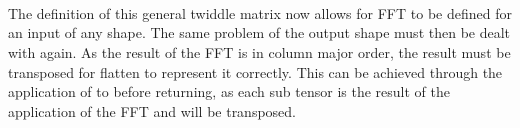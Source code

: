 \begin{AgdaAlign}
\begin{code}
\AgdaSymbol{(}\AgdaSpace{}%
\AgdaSymbol{(}\AgdaSpace{}%
\AgdaSpace{}%
\AgdaSymbol{))}\AgdaSpace{}%
\AgdaSymbol{(}\AgdaSpace{}%
\AgdaSymbol{)}\<%
\end{code}
\begin{code}[hide]%
\>[2][@{}l@{\AgdaIndent{1}}]%
\>[6]\<%
\\
\>[6][@{}l@{\AgdaIndent{0}}]%
\>[8]\<%
\\
\>[8][@{}l@{\AgdaIndent{0}}]%
\>[10]\<%
\\
\>[10][@{}l@{\AgdaIndent{0}}]%
\>[12]\AgdaSymbol{\AgdaUnderscore{}}\AgdaSpace{}%
\AgdaSymbol{:}\AgdaSpace{}%
\AgdaSpace{}%
\AgdaSymbol{(}\AgdaSpace{}%
\AgdaSpace{}%
\AgdaSpace{}%
\AgdaSpace{}%
\AgdaSymbol{)}\<%
\end{code}
\end{AgdaAlign}

The definition of this general twiddle matrix now allows for FFT to be defined
for an input of any shape.
The same problem of the output shape must then be dealt with again.
As the result of the FFT is in column major order, the result must be transposed
for flatten to represent it correctly.
This can be achieved through the application of  to 
before returning, as each sub tensor is the result of the application of the FFT and
will be transposed.

